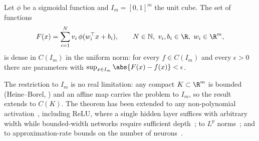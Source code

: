 \begin{theorem}
\label{thm:found:universal}
Let $\phi$ be a sigmoidal function and $I_m = [0,1]^m$ the unit cube. The set of
functions
\[
  F(x) = \sum_{i=1}^N v_i\, \phi(w_i^\top x + b_i), \qquad
  N \in \mathbb{N},\ v_i, b_i \in \R,\ w_i \in \R^m,
\]
is dense in $C(I_m)$ in the uniform norm: for every $f \in C(I_m)$ and every
$\epsilon > 0$ there are parameters with
$\sup_{x \in I_m} \abs{F(x) - f(x)} < \epsilon$.
\end{theorem}

The restriction to $I_m$ is no real limitation: any compact $K \subset \R^m$ is
bounded (Heine--Borel, ) and an affine map carries the problem
to $I_m$, so the result extends to $C(K)$. The theorem has been extended to any
non-polynomial activation~\citep{leshno1993multilayer}, including ReLU, where a
single hidden layer suffices with arbitrary width while bounded-width networks
require sufficient depth~\citep{lu2017expressive,hanin2019universal}; to $L^p$
norms~\citep{hornik1991approximation}; and to approximation-rate bounds on the
number of neurons~\citep{barron1993universal}.

